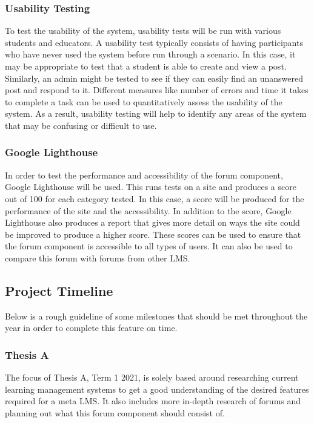 \subsubsection{Usability Testing}
To test the usability of the system, usability tests will be run with various students and educators.
A usability test typically consists of having participants who have never used the system before run through a scenario.
In this case, it may be appropriate to test that a student is able to create and view a post.
Similarly, an admin might be tested to see if they can easily find an unanswered post and respond to it.
Different measures like number of errors and time it takes to complete a task can be used to quantitatively assess the usability of the system.
As a result, usability testing will help to identify any areas of the system that may be confusing or difficult to use.

\subsubsection{Google Lighthouse}
In order to test the performance and accessibility of the forum component, Google Lighthouse will be used.
This runs tests on a site and produces a score out of 100 for each category tested.
In this case, a score will be produced for the performance of the site and the accessibility.
In addition to the score, Google Lighthouse also produces a report that gives more detail on ways the site could be improved to produce a higher score.
These scores can be used to ensure that the forum component is accessible to all types of users.
It can also be used to compare this forum with forums from other LMS.

\subsection{Project Timeline}
Below is a rough guideline of some milestones that should be met throughout the year in order to complete this feature on time.

\subsubsection{Thesis A}
The focus of Thesis A, Term 1 2021, is solely based around researching current learning management systems to get a good understanding of the desired features required for a meta LMS.
It also includes more in-depth research of forums and planning out what this forum component should consist of.

